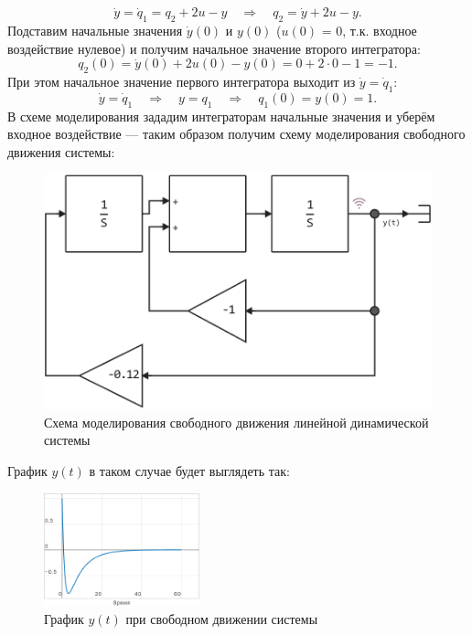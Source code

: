 \documentclass[a4paper]{article}
\begin{document}
$$\dot{y} = \dot{q}_1 = q_2 + 2u - y \quad \Rightarrow \quad q_2 = \dot{y} + 2u - y.$$
Подставим начальные значения $\dot{y}(0)$ и $y(0)$ ($u(0)$ = 0, т.к. входное воздействие нулевое) и получим начальное значение второго интегратора:
$$q_2(0) = \dot{y}(0) + 2u(0) - y(0) = 0 + 2\cdot0 - 1 = -1.$$
При этом начальное значение первого интегратора выходит из $\dot{y} = \dot{q}_1$:
$$\dot{y} = \dot{q}_1 \quad\Rightarrow\quad y = q_1 \quad\Rightarrow\quad q_1(0) = y(0) = 1.$$
В схеме моделирования зададим интеграторам начальные значения и уберём входное воздействие — таким образом получим схему моделирования свободного движения системы:
\begin{figure}[H]
    \centering
    \includegraphics[height=0.15\textheight]{sources/task1_free_model.png}
    \caption*{Схема моделирования свободного движения линейной динамической системы}
\end{figure}
График $y(t)$ в таком случае будет выглядеть так:
\begin{figure}[H]
    \centering
    \includegraphics[width=0.4\textwidth]{sources/task1_free_y.png}
    \caption*{График $y(t)$ при свободном движении системы}
\end{figure}
\end{document}
